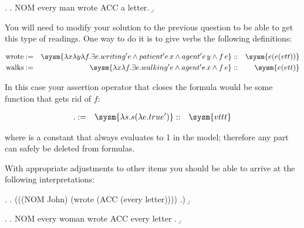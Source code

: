 \documentclass[10pt,a4paper]{exam}
\begin{document}
\begin{questions}
\ex.
\a. NOM every man wrote ACC a letter.
\b. 


You will need to modify  your solution to the previous question to be able to get this type of readings. One way to do it is to give verbs the following definitions:

\[
\begin{align*}
		\text{wrote}   &:=& \sysm{\lambda x\lambda y\lambda f.\exists e . writing' e \land patient' e\, x \land agent' e\, y \land f\, e }  &::& \sysm{e(e(vtt))}\\
	\text{walks}   &:=& \sysm{\lambda x\lambda f . \exists e . walking' e \land agent' e\, x \land f\, e }  &::& \sysm{e(vtt)}
\end{align*}
\]

In this case your assertion operator that closes the formula would be some function that gets rid of $f$:


\[
\begin{align*}
	\text{.}   &:=& \sysm{\lambda s . s (\lambda e . true') }  &::& \sysm{vttt}
\end{align*}
\]


where  is a constant that always evaluates to 1 in the model; therefore any part  can safely be deleted from formulas.

With appropriate adjustments to other items you should be able to
arrive at the following interpretations:


\ex.
\a. (((NOM John) (wrote (ACC (every letter)))) .)
\b. 


\ex.
\a.  NOM every woman wrote ACC every letter .
\b. 


\begin{solution}
\begin{ulexicon}


\end{ulexicon}
\end{solution}
\end{questions}
\end{document}
